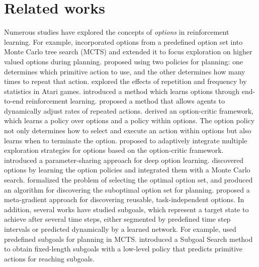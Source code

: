 \section{Related works}
Numerous studies have explored the concepts of \textit{options} in reinforcement learning.
For example, \citet{dewaard_monte_2016} incorporated options from a predefined option set into Monte Carlo tree search (MCTS) and extended it to focus exploration on higher valued options during planning.
\citet{sharma_learning_2016} proposed using two policies for planning: one determines which primitive action to use, and the other determines how many times to repeat that action.
\citet{durugkar_deep_2016} explored the effects of repetition and frequency by statistics in Atari games.
\citet{vezhnevets_strategic_2016} introduced a method which learns options through end-to-end reinforcement learning.
\citet{lakshminarayanan_dynamic_2017} proposed a method that allows agents to dynamically adjust rates of repeated actions.
\citet{bacon_optioncritic_2017} derived an option-critic framework, which learns a policy over options and a policy within options.
The option policy not only determines how to select and execute an action within options but also learns when to terminate the option.
\citet{kim_lesson_2023} proposed to adaptively integrate multiple exploration strategies for options based on the option-critic framework.
\citet{riemer_role_2020} introduced a parameter-sharing approach for deep option learning.
\citet{young_iterative_2023} discovered options by learning the option policies and integrated them with a Monte Carlo search.
\citet{jinnai_finding_2019} formalized the problem of selecting the optimal option set, and produced an algorithm for discovering the suboptimal option set for planning.
\citet{veeriah_discovery_2021} proposed a meta-gradient approach for discovering reusable, task-independent options.
In addition, several works have studied subgoals, which represent a target state to achieve after several time steps, either segmented by predefined time step intervals or predicted dynamically by a learned network.
For example, \citet{gabor_subgoalbased_2019} used predefined subgoals for planning in MCTS.
\citet{czechowski_subgoal_2021} introduced a Subgoal Search method to obtain fixed-length subgoals with a low-level policy that predicts primitive actions for reaching subgoals.
